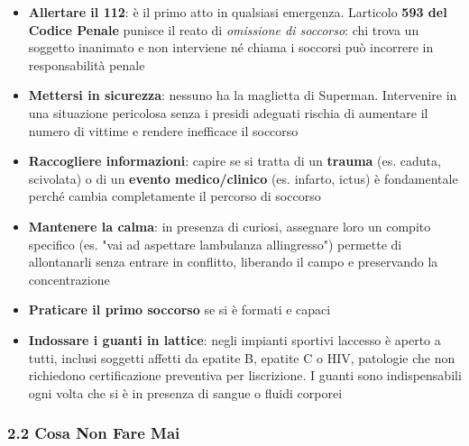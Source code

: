 \documentclass[a4paper,11pt]{article}
\providecommand{\tightlist}{%
  \setlength{\itemsep}{0pt}\setlength{\parskip}{0pt}}
\begin{document}
\begin{itemize}
      \tightlist
      \item
            \textbf{Allertare il 112}: è il primo atto in qualsiasi emergenza.
            L\textquotesingle articolo \textbf{593 del Codice Penale} punisce il
            reato di \emph{omissione di soccorso}: chi trova un soggetto inanimato
            e non interviene né chiama i soccorsi può incorrere in responsabilità
            penale
      \item
            \textbf{Mettersi in sicurezza}: nessuno ha la maglietta di Superman.
            Intervenire in una situazione pericolosa senza i presidi adeguati
            rischia di aumentare il numero di vittime e rendere inefficace il
            soccorso
      \item
            \textbf{Raccogliere informazioni}: capire se si tratta di un
            \textbf{trauma} (es. caduta, scivolata) o di un \textbf{evento
                  medico/clinico} (es. infarto, ictus) è fondamentale perché cambia
            completamente il percorso di soccorso
      \item
            \textbf{Mantenere la calma}: in presenza di curiosi, assegnare loro un
            compito specifico (es. "vai ad aspettare l\textquotesingle ambulanza
            all\textquotesingle ingresso") permette di allontanarli senza entrare
            in conflitto, liberando il campo e preservando la concentrazione
      \item
            \textbf{Praticare il primo soccorso} se si è formati e capaci
      \item
            \textbf{Indossare i guanti in lattice}: negli impianti sportivi
            l\textquotesingle accesso è aperto a tutti, inclusi soggetti affetti
            da epatite B, epatite C o HIV, patologie che non richiedono
            certificazione preventiva per l\textquotesingle iscrizione. I guanti
            sono indispensabili ogni volta che si è in presenza di sangue o fluidi
            corporei
\end{itemize}

\subsubsection{2.2 Cosa Non Fare Mai}\label{cosa-non-fare-mai}
\end{document}
